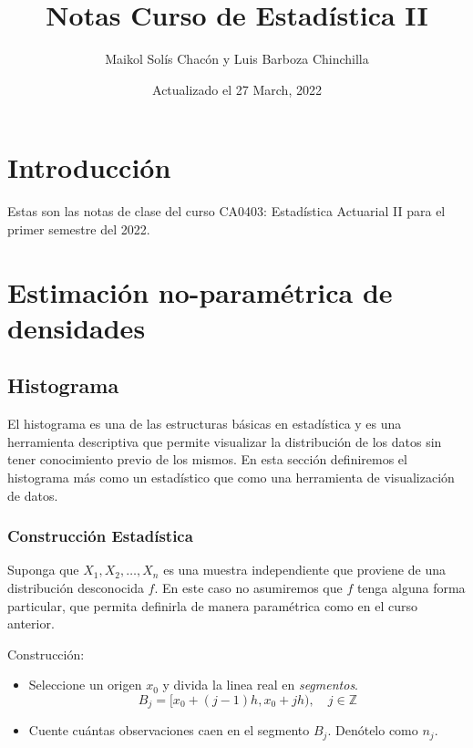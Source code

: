 \documentclass[
  12pt,
]{book}
\title{Notas Curso de Estadística II}
\author{Maikol Solís Chacón y Luis Barboza Chinchilla}
\date{Actualizado el 27 March, 2022}
\theoremstyle{definition}
\theoremstyle{definition}
\theoremstyle{definition}
\theoremstyle{definition}
\theoremstyle{remark}
\begin{document}
\maketitle

{
\hypersetup{linkcolor=}
\setcounter{tocdepth}{4}
\tableofcontents
}
\hypertarget{introducciuxf3n}{%
\chapter{Introducción}\label{introducciuxf3n}}

Estas son las notas de clase del curso CA0403: Estadística Actuarial II para el primer semestre del 2022.

\hypertarget{estimaciuxf3n-no-paramuxe9trica-de-densidades}{%
\chapter{Estimación no-paramétrica de densidades}\label{estimaciuxf3n-no-paramuxe9trica-de-densidades}}

\hypertarget{histograma}{%
\section{Histograma}\label{histograma}}

El histograma es una de las estructuras básicas en estadística y es una herramienta descriptiva que permite visualizar la distribución de los datos sin tener conocimiento previo de los mismos. En esta sección definiremos el histograma más como un estadístico que como una herramienta de visualización de datos.

\hypertarget{construcciuxf3n-estaduxedstica}{%
\subsection{Construcción Estadística}\label{construcciuxf3n-estaduxedstica}}

Suponga que \(X_1,X_2, \dots ,X_n\) es una muestra independiente que proviene de una distribución desconocida \(f\). En este caso no asumiremos que \(f\) tenga alguna forma particular, que permita definirla de manera paramétrica como en el curso anterior.

Construcción:

\begin{itemize}
\item
  Seleccione un origen \(x_0\) y divida la linea real en \emph{segmentos}.
  \begin{equation*}
  B_j = [x_0 +(j - 1)h,x_0 + jh), \quad j\in \mathbb{Z}
  \end{equation*}
\item
  Cuente cuántas observaciones caen en el segmento \(B_j\). Denótelo como \(n_j\).
\end{itemize}
\end{document}
